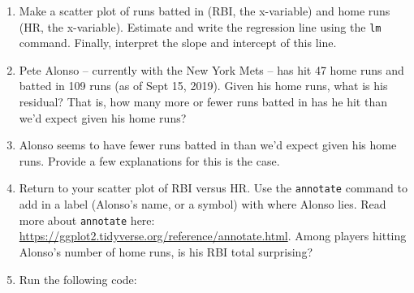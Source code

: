 \documentclass[]{article}
\newenvironment{Shaded}{\begin{snugshade}}{\end{snugshade}}
\newcommand{\DataTypeTok}[1]{\textcolor[rgb]{0.13,0.29,0.53}{#1}}
\newcommand{\DecValTok}[1]{\textcolor[rgb]{0.00,0.00,0.81}{#1}}
\newcommand{\KeywordTok}[1]{\textcolor[rgb]{0.13,0.29,0.53}{\textbf{#1}}}
\newcommand{\NormalTok}[1]{#1}
\newcommand{\OperatorTok}[1]{\textcolor[rgb]{0.81,0.36,0.00}{\textbf{#1}}}
\newcommand{\StringTok}[1]{\textcolor[rgb]{0.31,0.60,0.02}{#1}}
\begin{document}
\begin{enumerate}
\def\labelenumi{\arabic{enumi}.}
\setcounter{enumi}{3}
\item
  Make a scatter plot of runs batted in (RBI, the x-variable) and home
  runs (HR, the x-variable). Estimate and write the regression line
  using the \texttt{lm} command. Finally, interpret the slope and
  intercept of this line.
\item
  Pete Alonso -- currently with the New York Mets -- has hit 47 home
  runs and batted in 109 runs (as of Sept 15, 2019). Given his home
  runs, what is his residual? That is, how many more or fewer runs
  batted in has he hit than we'd expect given his home runs?
\item
  Alonso seems to have fewer runs batted in than we'd expect given his
  home runs. Provide a few explanations for this is the case.
\item
  Return to your scatter plot of RBI versus HR. Use the
  \texttt{annotate} command to add in a label (Alonso's name, or a
  symbol) with where Alonso lies. Read more about \texttt{annotate}
  here: \url{https://ggplot2.tidyverse.org/reference/annotate.html}.
  Among players hitting Alonso's number of home runs, is his RBI total
  surprising?
\item
  Run the following code:
\end{enumerate}

\begin{Shaded}
\end{Shaded}
\end{document}
